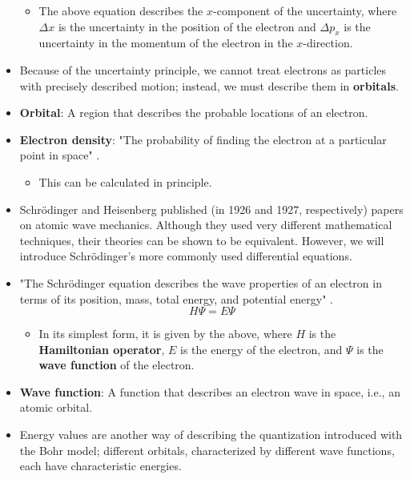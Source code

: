 \documentclass[../notes.tex]{subfiles}
\begin{document}
\begin{itemize}
    \begin{itemize}
        \item The above equation describes the $x$-component of the uncertainty, where $\Delta x$ is the uncertainty in the position of the electron and $\Delta p_x$ is the uncertainty in the momentum of the electron in the $x$-direction.
    \end{itemize}
    \item Because of the uncertainty principle, we cannot treat electrons as particles with precisely described motion; instead, we must describe them in \textbf{orbitals}.
    \item \textbf{Orbital}: A region that describes the probable locations of an electron.
    \item \textbf{Electron density}: "The probability of finding the electron at a particular point in space" \parencite[14]{bib:MiesslerFischerTarr}.
    \begin{itemize}
        \item This can be calculated in principle.
    \end{itemize}
    \item Schr\"{o}dinger and Heisenberg published (in 1926 and 1927, respectively) papers on atomic wave mechanics. Although they used very different mathematical techniques, their theories can be shown to be equivalent. However, we will introduce Schr\"{o}dinger's more commonly used differential equations.
    \item "The Schr\"{o}dinger equation describes the wave properties of an electron in terms of its position, mass, total energy, and potential energy" \parencite[14]{bib:MiesslerFischerTarr}.
    \begin{equation*}
        H\Psi = E\Psi
    \end{equation*}
    \begin{itemize}
        \item In its simplest form, it is given by the above, where $H$ is the \textbf{Hamiltonian operator}, $E$ is the energy of the electron, and $\Psi$ is the \textbf{wave function} of the electron.
    \end{itemize}
    \item \textbf{Wave function}: A function that describes an electron wave in space, i.e., an atomic orbital.
    \item Energy values are another way of describing the quantization introduced with the Bohr model; different orbitals, characterized by different wave functions, each have characteristic energies.

\end{itemize}
\end{document}
